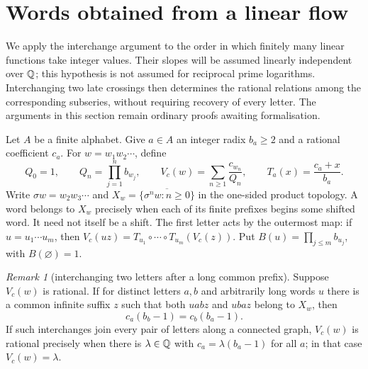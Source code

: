 \documentclass[11pt]{article}
\theoremstyle{remark}
\newtheorem{recordremark}[theorem]{Remark}
\renewenvironment{remark}[1][]{\begin{recordremark}[#1]}{\end{recordremark}}
\theoremstyle{plain}
\begin{document}
\section{Words obtained from a linear flow}
\label{long269:sec:clock-transfer}

We apply the interchange argument to the order in which finitely many
linear functions take integer values. Their slopes will be assumed
linearly independent over $\mathbb{Q}$; this hypothesis is not assumed for
reciprocal prime logarithms. Interchanging two late crossings then
determines the rational relations among the corresponding subseries,
without requiring recovery of every letter. The arguments in this
section remain ordinary proofs awaiting formalisation.

Let $A$ be a finite alphabet.  Give $a\in A$ an integer radix $b_a\ge2$
and a rational coefficient $c_a$.  For $w=w_1w_2\cdots$, define
\[
 Q_0=1,\qquad Q_n=\prod_{j=1}^n b_{w_j},\qquad
 V_c(w)=\sum_{n\ge1}\frac{c_{w_n}}{Q_n},\qquad
 T_a(x)=\frac{c_a+x}{b_a}.
\]
Write $\sigma w=w_2w_3\cdots$ and
$X_w=\overline{\{\sigma^nw:n\ge0\}}$ in the one-sided product topology.
A word belongs to $X_w$ precisely when each of its finite prefixes begins
some shifted word. It need not itself be a shift. The first letter acts
by the outermost map: if $u=u_1\cdots u_m$, then
$V_c(uz)=T_{u_1}\circ\cdots\circ T_{u_m}(V_c(z))$.  Put
$B(u)=\prod_{j\le m}b_{u_j}$, with $B(\varnothing)=1$.

\begin{remark}[interchanging two letters after a long common prefix]
\label{long269:lem:late-swap}
Suppose $V_c(w)$ is rational.  If for distinct letters $a,b$ and arbitrarily
long words $u$ there is a common infinite suffix $z$ such that both
$uabz$ and $ubaz$ belong to $X_w$, then
\[
 c_a(b_b-1)=c_b(b_a-1).
\]
If such interchanges join every pair of letters along a connected graph,
$V_c(w)$ is rational precisely when there is $\lambda\in\mathbb{Q}$ with
$c_a=\lambda(b_a-1)$ for all $a$; in that case $V_c(w)=\lambda$.
\end{remark}
\end{document}
